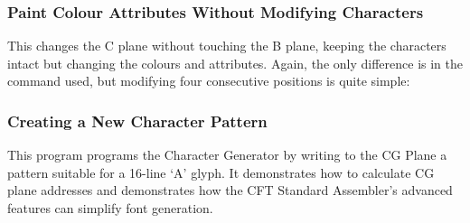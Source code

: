 \subsubsection{Paint Colour Attributes Without Modifying Characters}

This changes the C plane without touching the B plane, keeping the characters
intact but changing the colours and attributes. Again, the only difference is
in the command used, but modifying four consecutive positions is quite simple:




\subsubsection{Creating a New Character Pattern}

This program programs the Character Generator by writing to the CG
Plane a pattern suitable for a 16-line ‘A’ glyph. It demonstrates how
to calculate CG plane addresses and demonstrates how the CFT Standard
Assembler's advanced features can simplify font generation.

